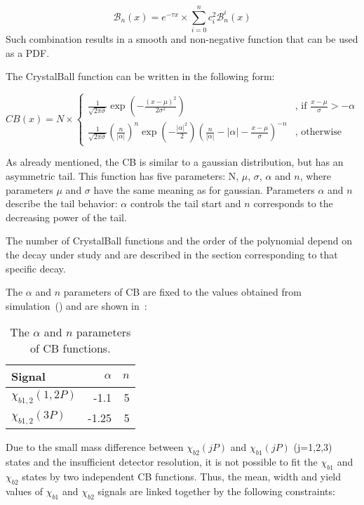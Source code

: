 \begin{equation}
\label{eq:bernstein}
{\mathscr B}_{n}(x) = e^{-\tau x} \times \sum_{i=0}^{n} c_{i}^2 {\mathscr B}_{n}^{i}(x)
\end{equation}
Such combination results in a smooth and non-negative function that can be used
as a PDF.

The CrystalBall function can be written in the following form:

\begin{equation}
CB(x) = N \times
\begin{cases}
\frac{1}{\sqrt{2\pi\sigma}}\exp(-\frac{{(x-\mu)}^2}{2\sigma^2}) & \text{, if $\frac{x-\mu}{\sigma} > -\alpha$} \\
\frac{1}{\sqrt{2\pi\sigma}}{(\frac{n}{|\alpha|})}^n \exp(-\frac{|\alpha|^2}{2}){(\frac{n}{|\alpha|}-|\alpha|-\frac{x-\mu}{\sigma})}^{-n} & \text{, otherwise}
\end{cases}
\label{eq:cb}
\end{equation}

As already mentioned, the CB is similar to a gaussian distribution, but has an asymmetric tail. This
function has five parameters: N, $\mu$, $\sigma$, $\alpha$ and $n$, where
parameters $\mu$ and $\sigma$ have the same meaning as for gaussian. Parameters
$\alpha$ and $n$ describe the tail behavior: $\alpha$ controls the tail start
and $n$ corresponds to the decreasing power of the tail. 

The number of CrystalBall functions and the order of the polynomial depend on
the decay under study and are described in the section corresponding to that
specific decay.


The $\alpha$ and $n$
parameters of CB are fixed to the values obtained from simulation~()
and are shown in~:


\begin{table}[H]
\caption{\small   The $\alpha$ and $n$ parameters of CB functions.}
\centering
\begin{tabular}{lrr}
\toprule
Signal & $\alpha$ & $n$ \\
\midrule
$\chi_{b1,2}(1,2P)$ & -1.1 & 5 \\
$\chi_{b1,2}(3P)$ & -1.25 & 5 \\
\bottomrule
\end{tabular}
\label{tab:chib:fit:tail}
\end{table}

Due to the small mass difference between $\chi_{b2}(jP)$ and $\chi_{b1}(jP)$
(j=1,2,3) states and the insufficient detector resolution, it is not possible
to fit the $\chi_{b1}$ and $\chi_{b2}$ states by two independent CB functions.
Thus, the mean, width and yield values of  $\chi_{b1}$ and $\chi_{b2}$ signals
are linked together by the following constraints:


